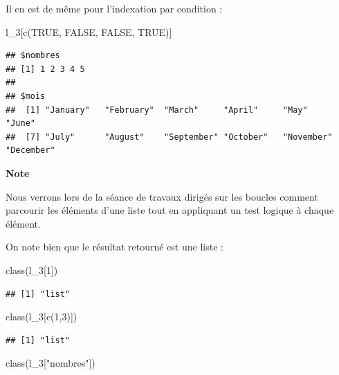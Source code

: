 \documentclass[
  11pt,
]{book}
\newenvironment{Shaded}{\begin{snugshade}}{\end{snugshade}}
\newcommand{\ConstantTok}[1]{\textcolor[rgb]{0.00,0.00,0.00}{#1}}
\newcommand{\DecValTok}[1]{\textcolor[rgb]{0.00,0.00,0.81}{#1}}
\newcommand{\FunctionTok}[1]{\textcolor[rgb]{0.00,0.00,0.00}{#1}}
\newcommand{\NormalTok}[1]{#1}
\newcommand{\StringTok}[1]{\textcolor[rgb]{0.31,0.60,0.02}{#1}}
\numberwithin{equation}{section}
\numberwithin{countremarque}{section}
\newenvironment{notebox}{
  \begin{tcolorbox}[breakable, colback=jaune,coltext=black,
                  colframe=grisfonce]}
 {\end{tcolorbox}}
\begin{document}
Il en est de même pour l'indexation par condition :

\begin{Shaded}
\begin{Highlighting}[]
\NormalTok{l\_3[}\FunctionTok{c}\NormalTok{(}\ConstantTok{TRUE}\NormalTok{, }\ConstantTok{FALSE}\NormalTok{, }\ConstantTok{FALSE}\NormalTok{, }\ConstantTok{TRUE}\NormalTok{)]}
\end{Highlighting}
\end{Shaded}

\begin{lstlisting}
## $nombres
## [1] 1 2 3 4 5
## 
## $mois
##  [1] "January"   "February"  "March"     "April"     "May"       "June"     
##  [7] "July"      "August"    "September" "October"   "November"  "December"
\end{lstlisting}

\begin{notebox}
\textbf{Note}

Nous verrons lors de la séance de travaux dirigés sur les boucles comment parcourir les éléments d'une liste tout en appliquant un test logique à chaque élément.

\end{notebox}

On note bien que le résultat retourné est une liste :

\begin{Shaded}
\begin{Highlighting}[]
\FunctionTok{class}\NormalTok{(l\_3[}\DecValTok{1}\NormalTok{])}
\end{Highlighting}
\end{Shaded}

\begin{lstlisting}
## [1] "list"
\end{lstlisting}

\begin{Shaded}
\begin{Highlighting}[]
\FunctionTok{class}\NormalTok{(l\_3[}\FunctionTok{c}\NormalTok{(}\DecValTok{1}\NormalTok{,}\DecValTok{3}\NormalTok{)])}
\end{Highlighting}
\end{Shaded}

\begin{lstlisting}
## [1] "list"
\end{lstlisting}

\begin{Shaded}
\begin{Highlighting}[]
\FunctionTok{class}\NormalTok{(l\_3[}\StringTok{"nombres"}\NormalTok{])}
\end{Highlighting}
\end{Shaded}
\end{document}
